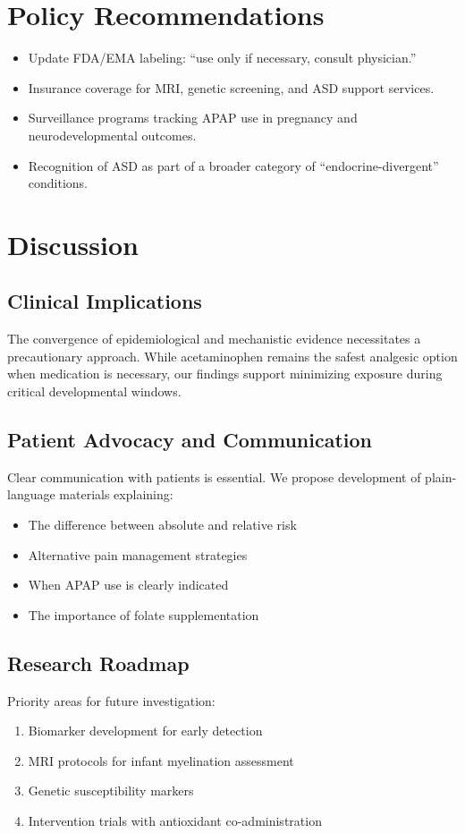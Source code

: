 \documentclass[12pt]{article}
\begin{document}
\section{Policy Recommendations}
\begin{itemize}
    \item Update FDA/EMA labeling: ``use only if necessary, consult physician.''
    \item Insurance coverage for MRI, genetic screening, and ASD support services.
    \item Surveillance programs tracking APAP use in pregnancy and neurodevelopmental outcomes.
    \item Recognition of ASD as part of a broader category of ``endocrine-divergent'' conditions.
\end{itemize}

\section{Discussion}

\subsection{Clinical Implications}
The convergence of epidemiological and mechanistic evidence necessitates a precautionary approach. While acetaminophen remains the safest analgesic option when medication is necessary, our findings support minimizing exposure during critical developmental windows.

\subsection{Patient Advocacy and Communication}
Clear communication with patients is essential. We propose development of plain-language materials explaining:
\begin{itemize}
    \item The difference between absolute and relative risk
    \item Alternative pain management strategies
    \item When APAP use is clearly indicated
    \item The importance of folate supplementation
\end{itemize}

\subsection{Research Roadmap}
Priority areas for future investigation:
\begin{enumerate}
    \item Biomarker development for early detection
    \item MRI protocols for infant myelination assessment
    \item Genetic susceptibility markers
    \item Intervention trials with antioxidant co-administration
\end{enumerate}
\end{document}
